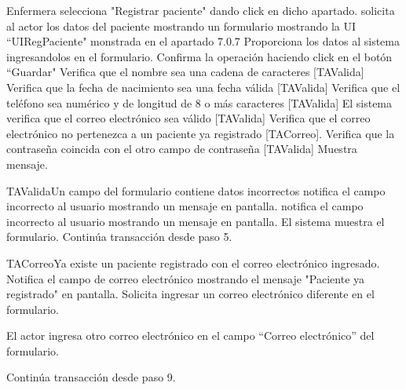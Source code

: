 \begin{UCtrayectoria}{Enfermera}
		\UCpaso[\UCactor] selecciona "Registrar  paciente" dando click en dicho apartado.
		\UCpaso solicita al actor los datos del paciente mostrando un formulario mostrando la UI ``UIRegPaciente" monstrada en el apartado 7.0.7
        \UCpaso [\UCactor] Proporciona los datos al sistema ingresandolos en el formulario.
         \UCpaso [\UCactor] Confirma la operación haciendo click en el botón ``Guardar"
         \UCpaso Verifica que el nombre sea una cadena de caracteres [TAValida]
         \UCpaso Verifica que la fecha de nacimiento sea una fecha válida [TAValida]
         \UCpaso Verifica que el teléfono sea numérico y de longitud de 8 o más caracteres [TAValida]
         \UCpaso El sistema verifica que el correo electrónico sea válido [TAValida]
         \UCpaso Verifica que el correo electrónico no pertenezca a un paciente ya registrado [TACorreo].
		\UCpaso Verifica que la contraseña coincida con el otro campo de contraseña [TAValida]
        \UCpaso Muestra mensaje.
        

         
         



        

        
        
\end{UCtrayectoria}

\begin{UCtrayectoriaA}{TAValida}{Un campo del formulario contiene datos incorrectos}
\UCpaso notifica el campo incorrecto al usuario mostrando un mensaje en pantalla.
\UCpaso notifica el campo incorrecto al usuario mostrando un mensaje en pantalla.
\UCpaso El sistema muestra el formulario.
\UCpaso Continúa transacción desde paso 5.
	
	
\end{UCtrayectoriaA}


\begin{UCtrayectoriaA}{TACorreo}{Ya existe un paciente registrado con el correo electrónico ingresado.}
\UCpaso Notifica el campo de correo electrónico mostrando el mensaje "Paciente ya registrado" en pantalla.
\UCpaso Solicita ingresar un correo electrónico diferente en el formulario.

\UCpaso [\UCactor] El actor ingresa otro correo electrónico en el campo “Correo electrónico” del formulario.

\UCpaso Continúa transacción desde paso 9.
\end{UCtrayectoriaA}

